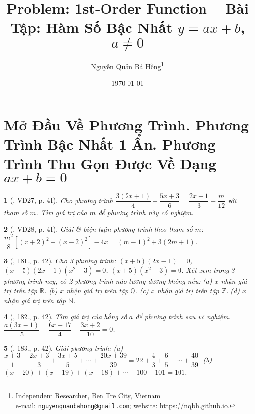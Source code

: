 \documentclass{article}
\title{Problem: 1st-Order Function -- Bài Tập: Hàm Số Bậc Nhất $y = ax + b$, $a\ne0$}
\author{Nguyễn Quản Bá Hồng\footnote{Independent Researcher, Ben Tre City, Vietnam\\e-mail: \texttt{nguyenquanbahong@gmail.com}; website: \url{https://nqbh.github.io}.}}
\date{\today}
\newtheorem{baitoan}{}
\begin{document}
\maketitle
\tableofcontents


\section{Mở Đầu Về Phương Trình. Phương Trình Bậc Nhất 1 Ẩn. Phương Trình Thu Gọn Được Về Dạng $ax + b = 0$}

\begin{baitoan}[\cite{Tuyen_Toan_8}, VD27, p. 41]
	Cho phương trình $\dfrac{3(2x + 1)}{4} - \dfrac{5x + 3}{6} = \dfrac{2x - 1}{3} + \dfrac{m}{12}$ với tham số $m$. Tìm giá trị của $m$ để phương trình này có nghiệm.
\end{baitoan}

\begin{baitoan}[\cite{Tuyen_Toan_8}, VD28, p. 41]
	Giải \& biện luận phương trình theo tham số $m$: $\dfrac{m^2}{8}\left[(x + 2)^2 - (x  - 2)^2\right] - 4x = (m - 1)^2 + 3(2m + 1)$.
\end{baitoan}

\begin{baitoan}[\cite{Tuyen_Toan_8}, 181., p. 42]
	Cho 3 phương trình: $(x + 5)(2x - 1) = 0$, $(x + 5)(2x - 1)(x^2 - 3) = 0$, $(x + 5)(x^2 - 3) = 0$. Xét xem trong 3 phương trình này, có 2 phương trình nào tương đương không nếu: (a) $x$ nhận giá trị trên tập $\mathbb{R}$. (b) $x$ nhận giá trị trên tập $\mathbb{Q}$. (c) $x$ nhận giá trị trên tập $\mathbb{Z}$. (d) $x$ nhận giá trị trên tập $\mathbb{N}$.
\end{baitoan}

\begin{baitoan}[\cite{Tuyen_Toan_8}, 182., p. 42]
	Tìm giá trị của hằng số $a$ để phương trình sau vô nghiệm: $\dfrac{a(3x - 1)}{5} - \dfrac{6x - 17}{4} + \dfrac{3x + 2}{10} = 0$.
\end{baitoan}

\begin{baitoan}[\cite{Tuyen_Toan_8}, 183., p. 42]
	Giải phương trình: (a) $\dfrac{x + 3}{1} + \dfrac{2x + 3}{3} + \dfrac{3x + 5}{5} + \cdots + \dfrac{20x + 39}{39} = 22 + \dfrac{4}{3} + \dfrac{6}{5} + \cdots + \dfrac{40}{39}$. (b) $(x - 20) + (x - 19) + (x - 18) + \cdots + 100 + 101 = 101$.
\end{baitoan}
\end{document}

